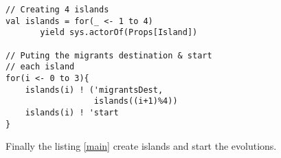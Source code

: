 \begin{lstlisting}[frame=none]
// Creating 4 islands
val islands = for(_ <- 1 to 4)
       yield sys.actorOf(Props[Island])
		
// Puting the migrants destination & start
// each island
for(i <- 0 to 3){
	islands(i) ! ('migrantsDest,
	              islands((i+1)%4))
	islands(i) ! 'start
}
\end{lstlisting}

Finally the listing \ref{main} create islands and start the evolutions.  